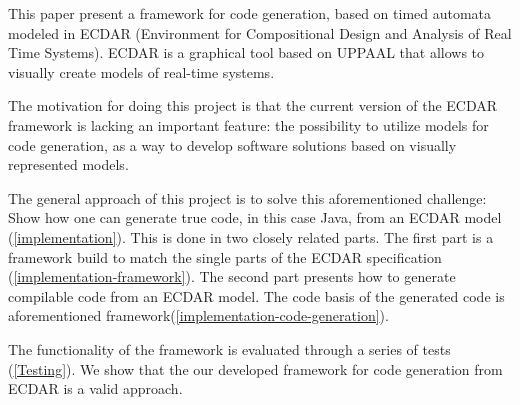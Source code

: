This paper present a framework for code generation, based on timed automata
modeled in ECDAR (Environment for Compositional Design and Analysis of Real Time
Systems). ECDAR is a graphical tool based on UPPAAL that allows to visually
create models of real-time systems.

The motivation for doing this project is that the current version of the ECDAR
framework is lacking an important feature: the possibility to utilize models for
code generation, as a way to develop software solutions based on visually
represented models.

The general approach of this project is to solve this aforementioned challenge:
Show how one can generate true code, in this case Java, from an ECDAR model
(\ref{implementation}). This is done in two closely related parts. The first
part is a framework build to match the single parts of the ECDAR specification
(\ref{implementation-framework}). The second part presents how to generate
compilable code from an ECDAR model. The code basis of the generated code is
aforementioned framework(\ref{implementation-code-generation}).

The functionality of the framework is evaluated through a series of tests
(\ref{Testing}). We show that the our developed framework for code generation from
ECDAR is a valid approach.
